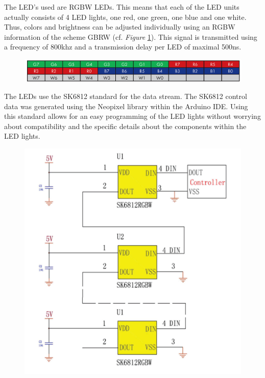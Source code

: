 \documentclass[a4paper,9pt]{article}
\begin{document}
\begin{multicols}{2}
\begin{figure}[H]
    \end{figure}
    The LED's used are RGBW LEDs. This means that each of the LED units actually consists of 4 LED lights, one red, one green, one blue and one white. Thus, colors and brightness can be adjusted individually using an RGBW information of the scheme GBRW (cf. \textit{Figure} \ref{Signal}). This signal is transmitted using a frequency of 800khz and a transmission delay per LED of maximal 500ns.
     \begin{figure}[H]
        \centering
        \includegraphics[width=0.7\linewidth]{Images/GRBW_1.jpg}
        \label{Signal}
    \end{figure}
    The LEDs use the SK6812 standard for the data stream. The SK6812 control data was generated using the Neopixel library within the Arduino IDE. Using this standard allows for an easy programming of the LED lights without worrying about compatibility and the specific details about the components within the LED lights.

\end{multicols} 
\begin{minipage}{0.48\linewidth}
\begin{figure}[H]

        \centering
         \includegraphics[width=.85\linewidth]{Images/chain_1.jpg}
        \label{LED chain diagram}
    \end{figure}
    \end{minipage}
\end{document}

